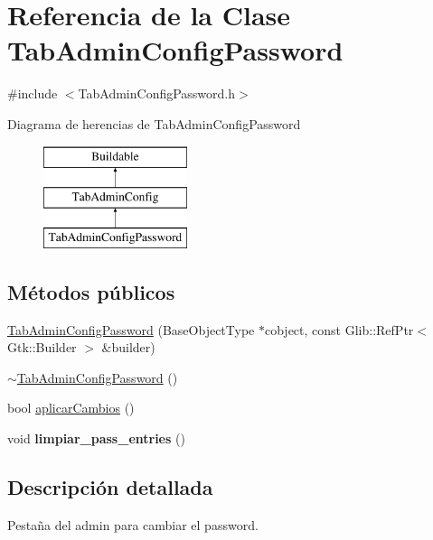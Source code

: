 \hypertarget{classTabAdminConfigPassword}{\section{\-Referencia de la \-Clase \-Tab\-Admin\-Config\-Password}
\label{classTabAdminConfigPassword}
}


{\ttfamily \#include $<$\-Tab\-Admin\-Config\-Password.\-h$>$}

\-Diagrama de herencias de \-Tab\-Admin\-Config\-Password\begin{figure}[H]
\begin{center}
\leavevmode
\includegraphics[height=3.000000cm]{classTabAdminConfigPassword}
\end{center}
\end{figure}
\subsection*{\-Métodos públicos}
\begin{DoxyCompactItemize}
\item 
\hyperlink{classTabAdminConfigPassword_a21e361886a40e601327c197f401dd337}{\-Tab\-Admin\-Config\-Password} (\-Base\-Object\-Type $\ast$cobject, const \-Glib\-::\-Ref\-Ptr$<$ \-Gtk\-::\-Builder $>$ \&builder)
\item 
\hyperlink{classTabAdminConfigPassword_a171bdb824852c6b948983489fc636d1a}{$\sim$\-Tab\-Admin\-Config\-Password} ()
\item 
bool \hyperlink{classTabAdminConfigPassword_a3fe304ac7eaa984ab5a4a19c01868067}{aplicar\-Cambios} ()
\item 
\hypertarget{classTabAdminConfigPassword_ac13ea43778c41c6df4d85c18c8ffaec5}{void {\bfseries limpiar\-\_\-pass\-\_\-entries} ()}\label{classTabAdminConfigPassword_ac13ea43778c41c6df4d85c18c8ffaec5}

\end{DoxyCompactItemize}


\subsection{\-Descripción detallada}
\-Pestaña del admin para cambiar el password. 

